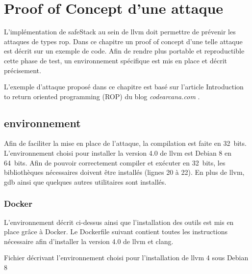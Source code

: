 \chapter{Proof of Concept d'une attaque}
\label{chap:attaque}

L'implémentation de \gls{safeStack} au sein de \gls{llvm} doit permettre de prévenir les attaques de types \gls{rop}. Dans ce chapitre un \og proof of concept \fg d'une telle attaque est décrit sur un exemple de code. Afin de rendre plus portable et reproductible cette phase de test, un environnement spécifique est mis en place et décrit précisement.

L'exemple d'attaque proposé dans ce chapitre est basé sur l'article \og Introduction to return oriented programming (ROP) \fg du blog \textit{codearcana.com} \cite{IntroductionToROP}.

\minitoc

\newpage

\section{environnement}

%
%

Afin de faciliter la mise en place de l'attaque, la compilation est faite en 32~bits. L'environnement choisi pour installer la version 4.0 de \gls{llvm} est Debian 8 en 64~bits. Afin de pouvoir correctement compiler et exécuter en 32~bits, les bibliothèques nécessaires doivent être installés (lignes 20 à 22). En plus de \gls{llvm}, \gls{gdb} ainsi que quelques autres utilitaires sont installés.

\subsection{Docker}

L'environnement décrit ci-dessus ainsi que l'installation des outils est mis en place grâce à Docker. Le Dockerfile suivant contient toutes les instructions nécessaire afin d'installer la version 4.0 de \gls{llvm} et \gls{clang}.

\begin{listing}
	\caption{Fichier décrivant l'environnement choisi pour l'installation de \gls{llvm} 4 sous Debian 8}
	\label{lst:dockerfile}
\end{listing}

